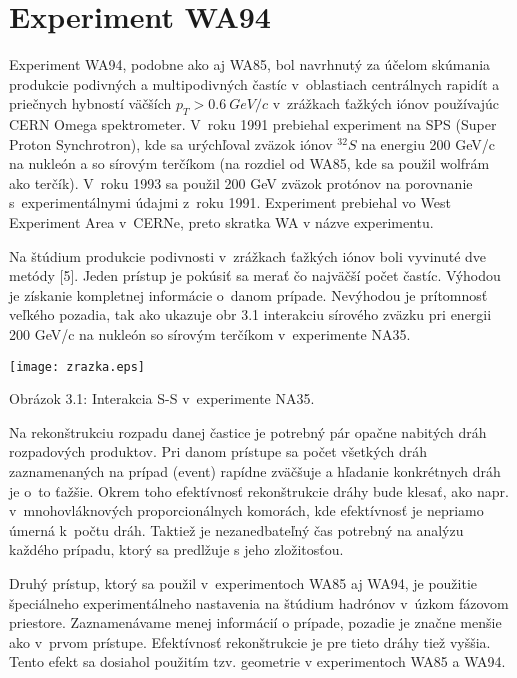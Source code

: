 \chapter{Experiment WA94}
Experiment WA94, podobne ako aj WA85, bol navrhnutý za účelom skúmania
produkcie podivných a multipodivných častíc v~oblastiach centrálnych rapidít
a priečnych hybností väčších $p_{T}>0.6\: GeV/c$ v~zrážkach ťažkých
iónov používajúc CERN Omega spektrometer. V~roku 1991 prebiehal
experiment na SPS (Super Proton Synchrotron), kde sa urýchľoval zväzok
iónov $^{32}S$ na energiu 200 GeV/c na nukleón a so sírovým terčíkom (na
rozdiel od WA85, kde sa použil wolfrám ako terčík). V~roku 1993 sa použil
200 GeV zväzok protónov na porovnanie s~experimentálnymi údajmi z~roku
1991. Experiment prebiehal vo West Experiment Area v~CERNe, preto skratka WA
v názve experimentu.

Na štúdium produkcie podivnosti v~zrážkach ťažkých iónov boli
vyvinuté dve metódy [5]. Jeden prístup je pokúsiť sa merať čo najväčší
počet častíc. Výhodou je získanie kompletnej informácie o~danom prípade.
Nevýhodou je prítomnosť veľkého pozadia, tak ako ukazuje obr 3.1 interakciu
sírového zväzku pri energii 200 GeV/c na nukleón so sírovým terčíkom
v~experimente NA35.


\begin{center}
  \texttt{[image: zrazka.eps]}
\end{center}
\begin{center}
  Obrázok 3.1: Interakcia S-S v~experimente NA35.
\end{center}
\newpage
Na rekonštrukciu rozpadu danej častice je potrebný pár opačne nabitých dráh
rozpadových produktov. Pri danom prístupe sa počet všetkých dráh
zaznamenaných na prípad (event) rapídne zväčšuje a hľadanie konkrétnych
dráh je o~to ťažšie. Okrem toho efektívnosť rekonštrukcie dráhy bude klesať,
ako napr. v~mnohovláknových proporcionálnych komorách, kde efektívnosť je
nepriamo úmerná k~počtu dráh. Taktiež  je
nezanedbateľný čas potrebný na analýzu každého prípadu, ktorý sa predlžuje s
jeho zložitosťou.

Druhý prístup, ktorý sa použil v~experimentoch WA85 aj WA94, je použitie
špeciálneho experimentálneho nastavenia na štúdium hadrónov v~úzkom fázovom
priestore. Zaznamenávame menej informácií o prípade, pozadie je značne menšie
ako v~prvom prístupe. Efektívnosť rekonštrukcie je pre tieto dráhy tiež
vyššia. Tento efekt sa dosiahol použitím tzv.  geometrie v
experimentoch WA85 a WA94.

